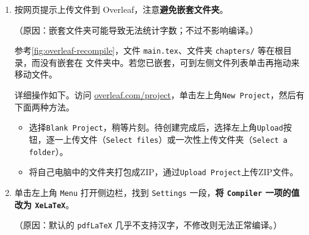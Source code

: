 \begin{enumerate}
  \item 按网页提示上传文件到 Overleaf，注意\textbf{避免嵌套文件夹}。

    （原因：嵌套文件夹可能导致无法统计字数；不过不影响编译。）

    参考\cref{fig:overleaf-recompile}，文件 \texttt{main.tex}、文件夹 \texttt{chapters/} 等在根目录，而没有嵌套在  文件夹中。若您已嵌套，可到左侧文件列表单击再拖动来移动文件。

    详细操作如下。访问 \href{https://cn.overleaf.com/project}{overleaf.com/project}，单击左上角\texttt{New Project}，然后有下面两种方法。

    \begin{itemize}
      \item 选择\texttt{Blank Project}，稍等片刻。待创建完成后，选择左上角\texttt{Upload}按钮，逐一上传文件（\texttt{Select files}）或一次性上传文件夹（\texttt{Select a folder}）。
      \item 将自己电脑中的文件夹打包成ZIP，通过\texttt{Upload Project}上传ZIP文件。
    \end{itemize}

  \item 单击左上角 \texttt{Menu} 打开侧边栏，找到 \texttt{Settings} 一段，\textbf{将 \texttt{Compiler} 一项的值改为 \texttt{XeLaTeX}}。

    （原因：默认的 \texttt{pdfLaTeX} 几乎不支持汉字，不修改则无法正常编译。）
\end{enumerate}
